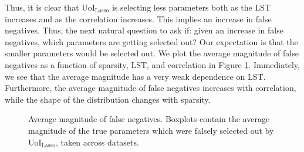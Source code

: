 \documentclass[11pt]{article}
\begin{document}
Thus, it is clear that UoI$_{\text{Lasso}}$ is selecting less parameters both as the LST increases and as the correlation increases. This implies an increase in false negatives. Thus, the next natural question to ask if: given an increase in false negatives, which parameters are getting selected out? Our expectation is that the smaller parameters would be selected out. We plot the average magnitude of false negatives as a function of sparsity, LST, and correlation in Figure \ref{fig:exp2-mag-fn}. Immediately, we see that the average magnitude has a very weak dependence on LST. Furthermore, the average magnitude of false negatives increases with correlation, while the shape of the distribution changes with sparsity.

\begin{figure}[H]
	\centering
	\caption{Average magnitude of false negatives. Boxplots contain the average magnitude of the true parameters which were falsely selected out by UoI$_{\text{Lasso}}$, taken across datasets. }
	\label{fig:exp2-mag-fn}
\end{figure}
\end{document}

